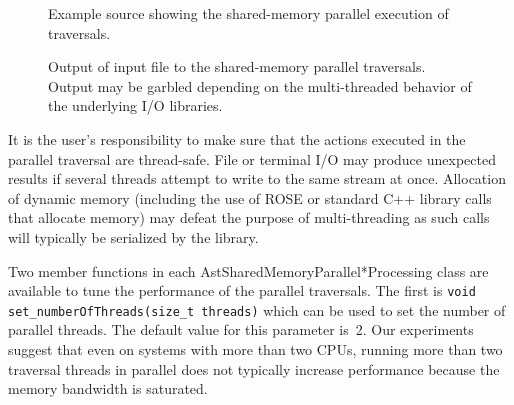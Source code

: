 \begin{figure}[!h]
{\indent
{\mySmallFontSize
\begin{latexonly}
   
\end{latexonly}
\begin{htmlonly}
   
\end{htmlonly}
}
}
\caption{Example source showing the shared-memory parallel execution of traversals.}
\label{Tutorial:exampleSharedMemoryTraversals}
\end{figure}
\begin{figure}[!h]
{\indent
{\mySmallFontSize
\begin{latexonly}
   
\end{latexonly}
\begin{htmlonly}
   
\end{htmlonly}
}
}
\caption{Output of input file to the shared-memory parallel traversals.
Output may be garbled depending on the multi-threaded behavior of the
underlying I/O libraries.}
\label{Tutorial:exampleOutput_SharedMemoryTraversals}
\end{figure}

    It is the user's responsibility to make sure that the actions executed in
the parallel traversal are thread-safe. File or terminal I/O may produce
unexpected results if several threads attempt to write to the same stream at
once. Allocation of dynamic memory (including the use of ROSE or standard C++
library calls that allocate memory) may defeat the purpose of multi-threading
as such calls will typically be serialized by the library.

    Two member functions in each AstSharedMemoryParallel*Processing class are
available to tune the performance of the parallel traversals. The first is
{\tt void set\_numberOfThreads(size\_t threads)} which can be used to set the
number of parallel threads. The default value for this parameter is~2. Our
experiments suggest that even on systems with more than two CPUs, running more
than two traversal threads in parallel does not typically increase performance
because the memory bandwidth is saturated.

